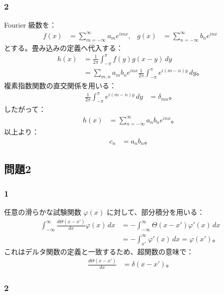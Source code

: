 \documentclass[platex,dvipdfmx,a4paper]{jsarticle}
\newcommand{\bbn}[2]{\frac{d #1}{d #2}}
\begin{document}
\subsubsection*{2}

Fourier 級数を：
\begin{align*}
  f(x)&=\sum_{m=-\infty}^{\infty}a_me^{imx},
  &g(x)&=\sum_{n=-\infty}^{\infty}b_ne^{inx}
\end{align*}
とする。畳み込みの定義へ代入する：
\begin{align*}
  h(x)
  &=\frac{1}{2\pi}\int_{-\pi}^{\pi}f(y)g(x-y)\,dy \\
  &=\sum_{m,n}a_mb_ne^{inx}\frac{1}{2\pi}
    \int_{-\pi}^{\pi}e^{i(m-n)y}\,dy。
\end{align*}
複素指数関数の直交関係を用いる：
\begin{align*}
  \frac{1}{2\pi}\int_{-\pi}^{\pi}e^{i(m-n)y}\,dy
  &=\delta_{mn}。
\end{align*}
したがって：
\begin{align*}
  h(x)
  &=\sum_{n=-\infty}^{\infty}a_nb_ne^{inx}。
\end{align*}
以上より：
\begin{align*}
  c_n&=a_nb_n。
\end{align*}

\subsection*{問題2}

\subsubsection*{1}

任意の滑らかな試験関数 $\varphi(x)$ に対して、部分積分を用いる：
\begin{align*}
  \int_{-\infty}^{\infty}\bbn{\Theta(x-x')}{x}\varphi(x)\,dx
  &=-\int_{-\infty}^{\infty}\Theta(x-x')\varphi'(x)\,dx \\
  &=-\int_{x'}^\infty\varphi'(x)\,dx
   =\varphi(x')。
\end{align*}
これはデルタ関数の定義と一致するため、超関数の意味で：
\begin{align*}
  \bbn{\Theta(x-x')}{x}
  &=\delta(x-x')。
\end{align*}

\subsubsection*{2}
\end{document}
